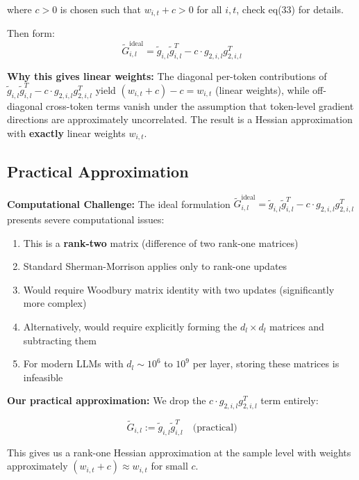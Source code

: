 \documentclass{article}
\begin{document}
where $c > 0$ is chosen such that $w_{i,t} + c > 0$ for all $i,t$, check eq(33) for details.

Then form:
\begin{equation}
\tilde{G}_{i,l}^{\text{ideal}} = \tilde{g}_{i,l}\tilde{g}_{i,l}^T - c \cdot g_{2,i,l}g_{2,i,l}^T
\end{equation}

\textbf{Why this gives linear weights:} The diagonal per-token contributions of $\tilde{g}_{i,l}\tilde{g}_{i,l}^T - c \cdot g_{2,i,l}g_{2,i,l}^T$ yield $(w_{i,t}+c) - c = w_{i,t}$ (linear weights), while off-diagonal cross-token terms vanish under the assumption that token-level gradient directions are approximately uncorrelated.
The result is a Hessian approximation with \textbf{exactly} linear weights $w_{i,t}$.

\subsection{Practical Approximation}

\textbf{Computational Challenge:} The ideal formulation $\tilde{G}_{i,l}^{\text{ideal}} = \tilde{g}_{i,l}\tilde{g}_{i,l}^T - c \cdot g_{2,i,l}g_{2,i,l}^T$ presents severe computational issues:

\begin{enumerate}
    \item This is a \textbf{rank-two} matrix (difference of two rank-one matrices)
    \item Standard Sherman-Morrison applies only to rank-one updates
    \item Would require Woodbury matrix identity with two updates (significantly more complex)
    \item Alternatively, would require explicitly forming the $d_l \times d_l$ matrices and subtracting them
    \item For modern LLMs with $d_l \sim 10^6$ to $10^9$ per layer, storing these matrices is infeasible
\end{enumerate}

\textbf{Our practical approximation:} We drop the $c \cdot g_{2,i,l}g_{2,i,l}^T$ term entirely:

\begin{equation}
\tilde{G}_{i,l} := \tilde{g}_{i,l}\tilde{g}_{i,l}^T \quad \text{(practical)}
\end{equation}

This gives us a rank-one Hessian approximation at the sample level with weights approximately $(w_{i,t}+c) \approx w_{i,t}$ for small $c$.
\end{document}
